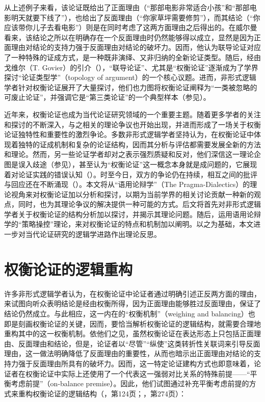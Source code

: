 \documentclass[b5paper,10.5pt,onecolumn,twoside,UTF8]{article}
\begin{document}
从上述例子来看，该论证既给出了正面理由（“那部电影非常适合小孩”和“那部电影明天就要下线了”），也给出了反面理由（“你家草坪需要修剪”），而其结论（“你应该带你儿子去看电影”）则是在同时考虑了这两方面理由之后得出的。在威尔曼看来，该结论之所以在明确存在一个反面理由时仍然能够得以成立，显然是因为正面理由对结论的支持力强于反面理由对结论的破坏力。因而，他认为联导论证对应了一种特殊的证成方式，是一种既非演绎、又非归纳的全新论证类型。随后，经由戈维尔（T. Govier）的引介（\parencite{a5}），“联导论证”、尤其是“权衡论证”逐渐成为了学界探讨“论证类型学”（topology of argument）的一个核心议题。进而，非形式逻辑学者针对权衡论证展开了大量探讨，他们也力图将权衡论证阐释为“一类被忽略的可废止论证”，并强调它是“第三类论证”的一个典型样本（参见\parencite{a3,a6}）。

近年来，权衡论证也成为当代论证研究领域的一个重要主题。随着更多学者的关注和探讨的不断深入，与之相关的理论争议也开始出现，并进而形成了一场关于权衡论证独特性和重要性的激烈争论。多数非形式逻辑学者坚持认为，在权衡论证中体现着独特的证成机制和复杂的论证结构，因而其分析与评估都需要发展全新的方法和理论。然而，另一些论证学者却对之表示强烈质疑和反对，他们深信这一理论企图是误入歧途（参见\parencite{a10,a14}），甚至认为“权衡论证”这一概念本身就是成问题的，它展现着对论证实践的错误认知（\parencite{a1}）。时至今日，双方的争论仍在持续，相互之间的批评与回应还在不断涌现（\parencite{a2,a7,a11}）。本文将从“语用论辩学”（The Pragma-Dialectics）的理论视角来对权衡论证加以分析和探讨，以期为当前学界的相关讨论贡献一种新的观点，同时，也为其理论争议的解决提供一种可能的方式。后文将首先对非形式逻辑学者关于权衡论证的结构分析加以探讨，并揭示其理论问题。随后，运用语用论辩学的“策略操控”理论，来对权衡论证的特点和机制加以阐明。以之为基础，本文进一步对当代论证研究的逻辑学进路作出理论反思。

\vspace{-0.5em}

\section{权衡论证的逻辑重构}

\vspace{-0.5em}

许多非形式逻辑学者认为，在权衡论证中论证者通过明确引述正反两方面的理由，来试图向听众表明结论是经由权衡所得，因为正面理由能够胜过反面理由，保证了结论仍然成立。与此相应，这一内在的“权衡机制”（weighing and balancing）也即是刻画权衡论证的关键，因而，要恰当解析权衡论证的逻辑结构，就需要合理地重构其中的这一权衡机制。依他们之见，虽然权衡论证在表达形态上只包括正面理由、反面理由和结论，但是，论证者以“尽管”“纵使”这类转折性关联词来引导反面理由，这一做法明确降低了反面理由的重要性，从而也暗示出正面理由对结论的支持力强于反面理由所具有的破坏力。因而，这一特定论证建构方式也即意味着，论证者在权衡论证中实际上还使用了一个代表这一强弱对比关系的特殊前提——“平衡考虑前提”（on-balance premise）。因此，他们试图通过补充平衡考虑前提的方式来重构权衡论证的逻辑结构（\parencite{a2}，第124页；\parencite{a7}，第274页）：
\end{document}
